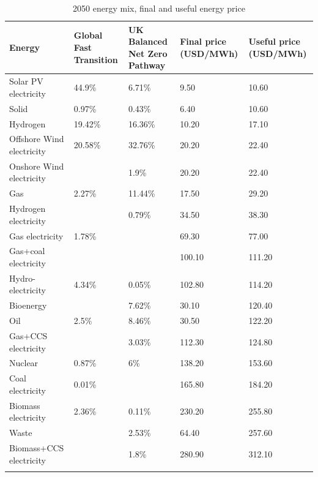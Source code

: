 \begin{longtable}{P{5cm}P{3cm}P{2cm}P{3cm}P{3cm}}
\caption{2050 energy mix, final and useful energy price} \\ 
  \hline
Energy & Global Fast Transition & UK Balanced Net Zero Pathway & Final price (USD/MWh) & Useful price (USD/MWh) \\ 
  \hline
Solar PV electricity & 44.9\% & 6.71\% & 9.50 & 10.60 \\ 
  Solid & 0.97\% & 0.43\% & 6.40 & 10.60 \\ 
  Hydrogen & 19.42\% & 16.36\% & 10.20 & 17.10 \\ 
  Offshore Wind electricity & 20.58\% & 32.76\% & 20.20 & 22.40 \\ 
  Onshore Wind electricity &  & 1.9\% & 20.20 & 22.40 \\ 
  Gas & 2.27\% & 11.44\% & 17.50 & 29.20 \\ 
  Hydrogen electricity &  & 0.79\% & 34.50 & 38.30 \\ 
  Gas electricity & 1.78\% &  & 69.30 & 77.00 \\ 
  Gas+coal electricity &  &  & 100.10 & 111.20 \\ 
  Hydro-electricity & 4.34\% & 0.05\% & 102.80 & 114.20 \\ 
  Bioenergy &  & 7.62\% & 30.10 & 120.40 \\ 
  Oil & 2.5\% & 8.46\% & 30.50 & 122.20 \\ 
  Gas+CCS electricity &  & 3.03\% & 112.30 & 124.80 \\ 
  Nuclear & 0.87\% & 6\% & 138.20 & 153.60 \\ 
  Coal electricity & 0.01\% &  & 165.80 & 184.20 \\ 
  Biomass electricity & 2.36\% & 0.11\% & 230.20 & 255.80 \\ 
  Waste &  & 2.53\% & 64.40 & 257.60 \\ 
  Biomass+CCS electricity &  & 1.8\% & 280.90 & 312.10 \\ 
   \hline
\hline
\label{tab_final_price_energy}
\end{longtable}
